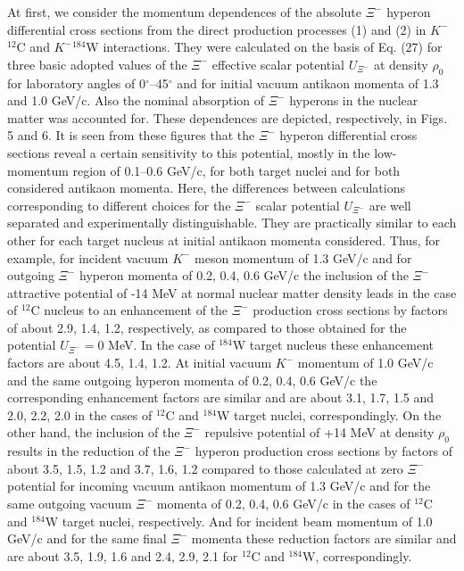 \documentclass[12pt]{article}
\begin{document}
\hspace{0.5cm} At first, we consider the momentum dependences of the absolute $\Xi^-$ hyperon differential
cross sections from the direct production processes (1) and (2) in $K^-$$^{12}$C and $K^-$$^{184}$W interactions.
They were calculated on the basis of Eq. (27) for three basic
adopted values of the $\Xi^-$ effective scalar potential $U_{\Xi^-}$ at density $\rho_0$ for laboratory angles
of 0$^{\circ}$--45$^{\circ}$ and for initial vacuum antikaon momenta of 1.3 and 1.0 GeV/c. Also the nominal
absorption of $\Xi^-$ hyperons in the nuclear matter was accounted for. These dependences are depicted,
respectively, in Figs. 5 and 6. It is seen from these figures
that the $\Xi^-$ hyperon differential cross sections reveal a certain sensitivity to this potential,
mostly in the low-momentum region of 0.1--0.6 GeV/c, for both target nuclei
and for both considered antikaon momenta. Here, the differences between calculations corresponding to
different choices for the $\Xi^-$ scalar potential $U_{\Xi^-}$ are well separated and experimentally
distinguishable. They are practically similar to each other for each target nucleus at initial antikaon momenta
considered. Thus, for example, for incident vacuum $K^-$ meson momentum of 1.3 GeV/c and for outgoing
$\Xi^-$ hyperon momenta of 0.2, 0.4, 0.6 GeV/c the inclusion of the
$\Xi^-$ attractive potential of -14 MeV at normal nuclear matter density leads in the case of $^{12}$C nucleus
to an enhancement of the
$\Xi^-$ production cross sections by factors of about 2.9, 1.4, 1.2, respectively,
as compared to those obtained for the potential $U_{\Xi^-}=0$ MeV.
In the case of $^{184}$W target nucleus these enhancement factors are about 4.5, 1.4, 1.2.
At initial vacuum $K^-$ momentum of 1.0 GeV/c and the same outgoing hyperon momenta of 0.2, 0.4, 0.6 GeV/c
the corresponding enhancement factors are similar and are about 3.1, 1.7, 1.5 and 2.0, 2.2, 2.0 in the cases
of $^{12}$C and $^{184}$W target nuclei, correspondingly. On the other hand, the inclusion of the $\Xi^-$
repulsive potential of +14 MeV at density $\rho_0$ results in the reduction of the $\Xi^-$ hyperon production
cross sections by factors of about 3.5, 1.5, 1.2 and 3.7, 1.6, 1.2 compared to those calculated at zero $\Xi^-$
potential for incoming vacuum antikaon momentum of 1.3 GeV/c and for the same outgoing vacuum $\Xi^-$ momenta
of 0.2, 0.4, 0.6 GeV/c in the cases of $^{12}$C and $^{184}$W target nuclei, respectively.
And for incident beam momentum of 1.0 GeV/c and for the same final $\Xi^-$ momenta these reduction factors
are similar and are about 3.5, 1.9, 1.6 and 2.4, 2.9, 2.1 for $^{12}$C and $^{184}$W, correspondingly.
\end{document}

